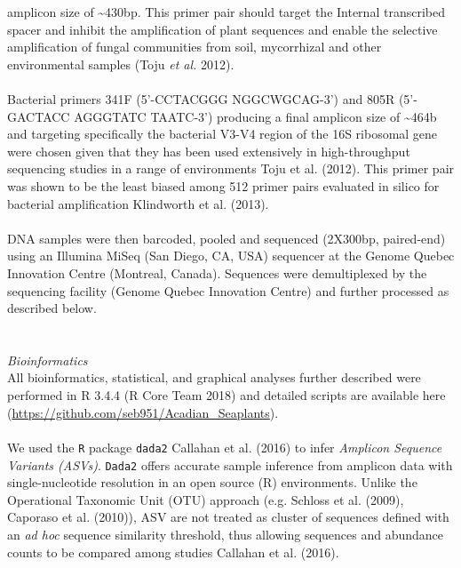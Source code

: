 \documentclass[11pt,]{article}
\begin{document}
amplicon size of \textasciitilde{}430bp. This primer pair should target
the Internal transcribed spacer and inhibit the amplification of plant
sequences and enable the selective amplification of fungal communities
from soil, mycorrhizal and other environmental samples (Toju \emph{et
al.} 2012).\\
\hspace*{0.333em}\\
Bacterial primers 341F (5'-CCTACGGG NGGCWGCAG-3') and 805R (5'-GACTACC
AGGGTATC TAATC-3') producing a final amplicon size of
\textasciitilde{}464b and targeting specifically the bacterial V3-V4
region of the 16S ribosomal gene were chosen given that they has been
used extensively in high-throughput sequencing studies in a range of
environments Toju et al. (2012). This primer pair was shown to be the
least biased among 512 primer pairs evaluated in silico for bacterial
amplification Klindworth et al. (2013).\\
\hspace*{0.333em}\\
DNA samples were then barcoded, pooled and sequenced (2X300bp,
paired-end) using an Illumina MiSeq (San Diego, CA, USA) sequencer at
the Genome Quebec Innovation Centre (Montreal, Canada). Sequences were
demultiplexed by the sequencing facility (Genome Quebec Innovation
Centre) and further processed as described below.\\
\hspace*{0.333em}\\
\hspace*{0.333em}\\
\emph{Bioinformatics}\\
All bioinformatics, statistical, and graphical analyses further
described were performed in R 3.4.4 (R Core Team 2018) and detailed
scripts are available here
(\url{https://github.com/seb951/Acadian_Seaplants}).\\
\hspace*{0.333em}\\
We used the \texttt{R} package \texttt{dada2} Callahan et al. (2016) to
infer \emph{Amplicon Sequence Variants (ASVs)}. \texttt{Dada2} offers
accurate sample inference from amplicon data with single-nucleotide
resolution in an open source (R) environments. Unlike the Operational
Taxonomic Unit (OTU) approach (e.g. Schloss et al. (2009), Caporaso et
al. (2010)), ASV are not treated as cluster of sequences defined with an
\emph{ad hoc} sequence similarity threshold, thus allowing sequences and
abundance counts to be compared among studies Callahan et al. (2016).\\
\end{document}
